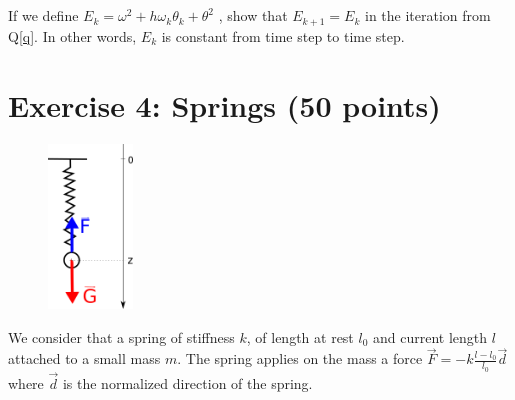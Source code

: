 \subsection{} If we define $E_k = \omega^2 + h\omega_k\theta_k + \theta^2$ , show that $E_{k+1} = E_k$ in the iteration from Q\ref{q}. In other words, $E_k$ is constant from time step to time step.
  
 
\section*{Exercise 4: Springs \normalsize \textnormal(50 points)}


\begin{figure}
  \centering
  \vspace{-0.5cm}
\includegraphics[width=0.2\textwidth]{spring.png}
\vspace{-1.5cm}
\end{figure}

We consider that a spring of stiffness $k$, of length at rest $l_0$ and current length $l$ attached to a small mass $m$.
The spring applies on the mass a force $\vec{F} = -k\frac{l - l_0}{l_0} \vec{d}$ where $\vec{d}$ is the normalized direction of the spring.

